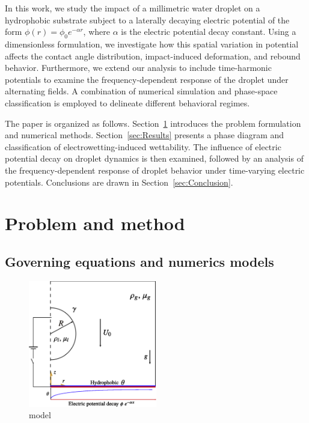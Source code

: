 \documentclass[lineno]{cls/jfm}
\begin{document}
In this work, we study the impact of a millimetric water droplet on a hydrophobic substrate subject to a laterally decaying electric potential of the form $\phi(r) = \phi_0 e^{-\alpha r}$, where $\alpha$ is the electric potential decay constant. Using a dimensionless formulation, we investigate how this spatial variation in potential affects the contact angle distribution, impact-induced deformation, and rebound behavior. Furthermore, we extend our analysis to include time-harmonic potentials to examine the frequency-dependent response of the droplet under alternating fields. A combination of numerical simulation and phase-space classification is employed to delineate different behavioral regimes.

The paper is organized as follows. Section~\ref{sec:Problem and method} introduces the problem formulation and numerical methods. Section~\ref{sec:Results} presents a phase diagram and classification of electrowetting-induced wettability. The influence of electric potential decay on droplet dynamics is then examined, followed by an analysis of the frequency-dependent response of droplet behavior under time-varying electric potentials. Conclusions are drawn in Section~\ref{sec:Conclusion}.

\section{Problem and method}\label{sec:Problem and method}

\subsection{Governing equations and numerics models}

 \begin{figure}
  \centerline{\includegraphics[width=0.5\textwidth]{fig/model.eps}}
  \caption{model}
 \label{fig:domain}
 \end{figure}
\end{document}
